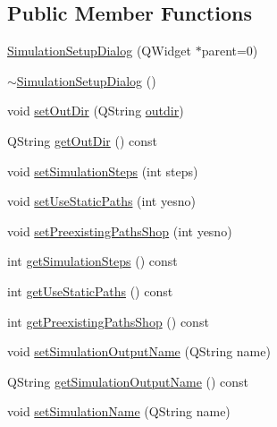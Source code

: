 \subsection*{Public Member Functions}
\begin{DoxyCompactItemize}
\item 
\mbox{\hyperlink{class_simulation_setup_dialog_a335840ce4453718ba812eac74a2d4939}{Simulation\+Setup\+Dialog}} (Q\+Widget $\ast$parent=0)
\item 
\mbox{\hyperlink{class_simulation_setup_dialog_ab47d97ccdfc0f328e8b16d6424bd3e3d}{$\sim$\+Simulation\+Setup\+Dialog}} ()
\item 
void \mbox{\hyperlink{class_simulation_setup_dialog_ae0fdf5c99745d09c7ab484e9c30e6573}{set\+Out\+Dir}} (Q\+String \mbox{\hyperlink{simulator_2main_8cpp_a5032743b5127232204c872f8f2bda528}{outdir}})
\item 
Q\+String \mbox{\hyperlink{class_simulation_setup_dialog_a752c7e1666e62f03f26c50332b878759}{get\+Out\+Dir}} () const
\item 
void \mbox{\hyperlink{class_simulation_setup_dialog_aa1be4c5a5c279bda5a26f9d901dcae9c}{set\+Simulation\+Steps}} (int steps)
\item 
void \mbox{\hyperlink{class_simulation_setup_dialog_ad520ec887eec793453ccc4820be9f35f}{set\+Use\+Static\+Paths}} (int yesno)
\item 
void \mbox{\hyperlink{class_simulation_setup_dialog_a2d86519a9e486d088de8681857db8e00}{set\+Preexisting\+Paths\+Shop}} (int yesno)
\item 
int \mbox{\hyperlink{class_simulation_setup_dialog_a7f747d753edac855918d94d2f49c5989}{get\+Simulation\+Steps}} () const
\item 
int \mbox{\hyperlink{class_simulation_setup_dialog_abe5652dc5074d47f9d368657d06bad39}{get\+Use\+Static\+Paths}} () const
\item 
int \mbox{\hyperlink{class_simulation_setup_dialog_a970678edb5a427cfb932aba52c506b80}{get\+Preexisting\+Paths\+Shop}} () const
\item 
void \mbox{\hyperlink{class_simulation_setup_dialog_a5805195d6e2267b3a1fb06deab2458cf}{set\+Simulation\+Output\+Name}} (Q\+String name)
\item 
Q\+String \mbox{\hyperlink{class_simulation_setup_dialog_a28862916c3e54ee4d21e214214768201}{get\+Simulation\+Output\+Name}} () const
\item 
void \mbox{\hyperlink{class_simulation_setup_dialog_a236a81d194ed709185d2c799d6c7ccf3}{set\+Simulation\+Name}} (Q\+String name)
\item 

\end{DoxyCompactItemize}
